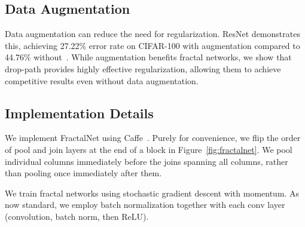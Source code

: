 \documentclass{article}
\newcommand{\fracnet}{FractalNet}
\newcommand{\droppath}{drop-path}
\newcommand{\Resnet}{ResNet}
\begin{document}
\subsection{Data Augmentation}
\label{sec:data-aug}

Data augmentation can reduce the need for regularization.  {\Resnet}
demonstrates this, achieving 27.22\% error rate on CIFAR-100 with augmentation
compared to 44.76\% without~\citep{huang2016stochasticdepth}.  While
augmentation benefits fractal networks, we show that {\droppath} provides
highly effective regularization, allowing them to achieve competitive results
even without data augmentation.

\subsection{Implementation Details}
\label{sec:implementation}

We implement {\fracnet} using Caffe~\citep{caffe14}.  Purely for convenience,
we flip the order of pool and join layers at the end of a block in
Figure~\ref{fig:fractalnet}.  We pool individual columns immediately before
the joins spanning all columns, rather than pooling once immediately after
them.

We train fractal networks using stochastic gradient descent with momentum.  As
now standard, we employ batch normalization together with each $\mathrm{conv}$
layer (convolution, batch norm, then ReLU).
 
\end{document}
